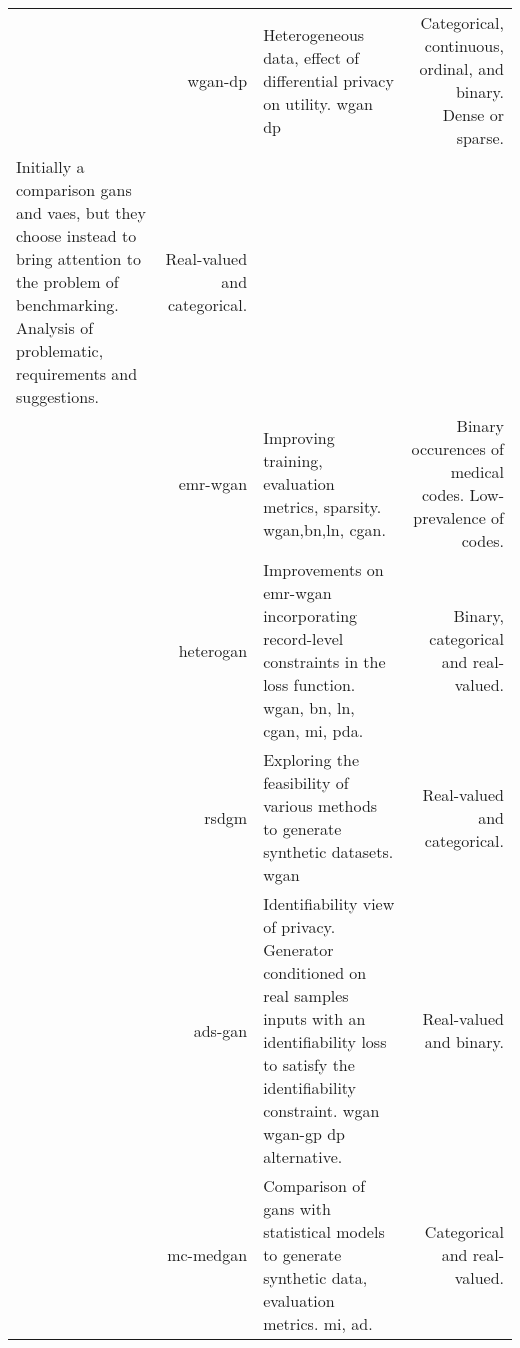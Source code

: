 \begin{center}
\begin{longtable}[l]{@{}p{}NMR@{}}
        \citeauthor{chincheong2020generation} & \gls{wgan-dp}
        & Heterogeneous data, effect of differential privacy on utility.   \gls{wgan} \gls{dp}
        & Categorical, continuous,  ordinal, and binary. Dense or sparse.\\
        
        \citeauthor{Camino2020bench} Initially a comparison \glspl{gan} and \glspl{vae}, but they choose instead to bring attention to the problem of benchmarking. Analysis of problematic,  requirements and suggestions. & Real-valued and categorical.\\
        
        \citeauthor{Zhang2020} & \gls{emr-wgan}
        & Improving training, evaluation metrics, sparsity.  \gls{wgan},\gls{bn},\gls{ln}, \gls{cgan}.
        & Binary occurences of medical codes. Low-prevalence of codes. \\
        
        \citeauthor{yan2020generating} & \gls{heterogan}
        & Improvements on \gls{emr-wgan} incorporating record-level constraints in the loss function.   \gls{wgan}, \gls{bn}, \gls{ln}, \gls{cgan}, \gls{mi}, \gls{pda}.
        & Binary, categorical and real-valued.\\
        
        \citeauthor{ozyigit2020generation} & \gls{rsdgm}
        & Exploring the feasibility of various methods to generate synthetic datasets.   \gls{wgan}
        & Real-valued and categorical.\\
        
        \citeauthor{Yoon2020-anon} & \gls{ads-gan}
        & Identifiability view of privacy. Generator conditioned on real samples inputs with an identifiability loss to satisfy the identifiability constraint.   \gls{wgan} \gls{wgan-gp} \gls{dp} alternative.
        & Real-valued and binary.\\
        
        \citeauthor{Goncalves2020} & \gls{mc-medgan}
        & Comparison of \glspl{gan} with statistical models to generate synthetic data, evaluation metrics.   \gls{mi}, \gls{ad}.
        & Categorical and real-valued.\\
           
        \hline
        
    \end{longtable}
\end{center}